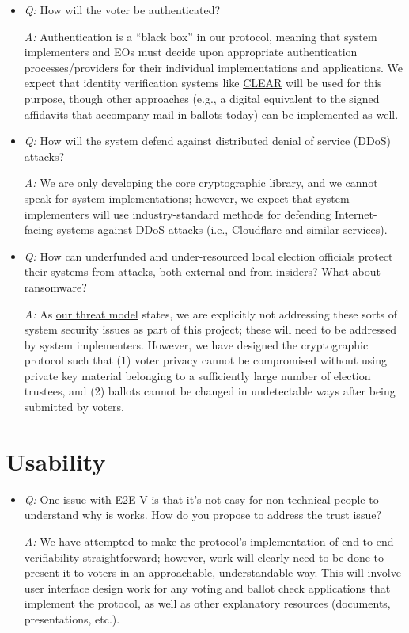 \documentclass[12pt,letter]{article}
\begin{document}
\begin{itemize}

    \item \emph{Q:} How will the voter be authenticated?

    \emph{A:} Authentication is a ``black box'' in our protocol, meaning that system implementers and EOs must decide upon appropriate authentication processes/providers for their individual implementations and applications. We expect that identity verification systems like \href{https://clearme.com/}{CLEAR} will be used for this purpose, though other approaches (e.g., a digital equivalent to the signed affidavits that accompany mail-in ballots today) can be implemented as well.

    \item \emph{Q:} How will the system defend against distributed denial of service (DDoS) attacks?

    \emph{A:} We are only developing the core cryptographic library, and we cannot speak for system implementations; however, we expect that system implementers will use industry-standard methods for defending Internet-facing systems against DDoS attacks (i.e., \href{https://cloudflare.com/}{Cloudflare} and similar services).

    \item \emph{Q:} How can underfunded and under-resourced local election officials protect their systems from attacks, both external and from insiders? What about ransomware?

    \emph{A:} As \href{https://github.com/FreeAndFair/MobileVotingCoreCryptography/releases/download/latest/threat-model.pdf}{our threat model} states, we are explicitly not addressing these sorts of system security issues as part of this project; these will need to be addressed by system implementers. However, we have designed the cryptographic protocol such that (1) voter privacy cannot be compromised without using private key material belonging to a sufficiently large number of election trustees, and (2) ballots cannot be changed in undetectable ways after being submitted by voters.

\end{itemize}

\section{Usability}

\begin{itemize}

    \item \emph{Q:} One issue with E2E-V is that it's not easy for non-technical people to understand why is works. How do you propose to address the trust issue?

    \emph{A:} We have attempted to make the protocol's implementation of end-to-end verifiability straightforward; however, work will clearly need to be done to present it to voters in an approachable, understandable way. This will involve user interface design work for any voting and ballot check applications that implement the protocol, as well as other explanatory resources (documents, presentations, etc.).

\end{itemize}
\end{document}
